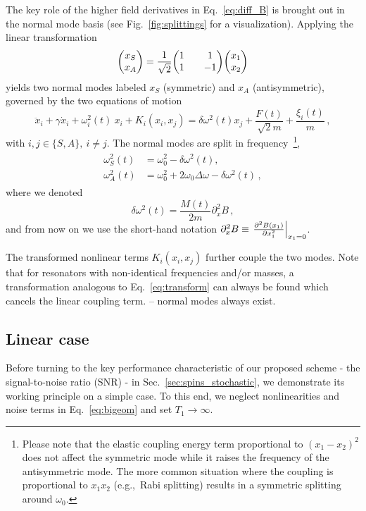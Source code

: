 The key role of the higher field derivatives in Eq.~\eqref{eq:diff_B} is brought out in the normal mode basis (see Fig.~\ref{fig:splittings} for a visualization). Applying the linear transformation
\begin{equation} \label{eq:transform}
\mqty(x_S \\ x_A) = \frac{1}{\sqrt{2}}\mqty(1 && 1 \\ 1 && -1) \mqty(x_1 \\ x_2)
\end{equation}
yields two normal modes labeled $x_S$ (symmetric) and $x_A$ (antisymmetric), governed by the two equations of motion
\begin{equation} \label{eq:bigeom}
\ddot{x}_i + \gamma \dot{x}_i +\omega_i^2(t) \: x_i + K_i(x_i, x_j) =  \delta\omega^2(t) x_j + \frac{F(t)}{\sqrt{2} m} + \frac{\xi_i(t)}{m} \,,
\end{equation}
with $i,j \in \{S,A\}, \: i \neq j$. The normal modes are split in frequency~\footnote{Please note that the elastic coupling energy term proportional to $(x_1-x_2)^2$ does not affect the symmetric mode while it raises the frequency of the antisymmetric mode. The more common situation where the coupling is proportional to $x_1 x_2$ (e.g.,~Rabi splitting) results in a symmetric splitting around $\omega_0$.},
\begin{align} \label{eq:normal_basis}
\begin{split}
\omega_S^2(t) &= \omega_0^2 - \delta\omega^2(t), \\
\omega_A^2(t) &= \omega_0^2 + 2 \omega_0 \Delta \omega- \delta\omega^2(t) \,,
\end{split}
\end{align}
where we denoted
\begin{equation} \label{eq:deltaomega}
\delta\omega^2(t) = \frac{M(t)}{2 m} \partial^2_x B \,,
\end{equation}
and from now on we use the short-hand notation $\partial^2_x B \equiv \eval{\frac{\partial^2 B(x_1)}{\partial x_1^2}}_{x_1 = 0}$. 

The transformed nonlinear terms $K_i(x_i, x_j)$ further couple the two modes. Note that for resonators with non-identical frequencies and/or masses, a transformation analogous to Eq.~\eqref{eq:transform} can always be found which cancels the linear coupling term. -- normal modes always exist.

\subsection{Linear case} \label{sec:linear}
Before turning to the key performance characteristic of our proposed scheme - the signal-to-noise ratio (SNR) - in Sec.~\ref{sec:spins_stochastic}, we demonstrate its working principle on a simple case. To this end, we neglect nonlinearities and noise terms in Eq.~\eqref{eq:bigeom} and set $T_1 \rightarrow \infty$.

